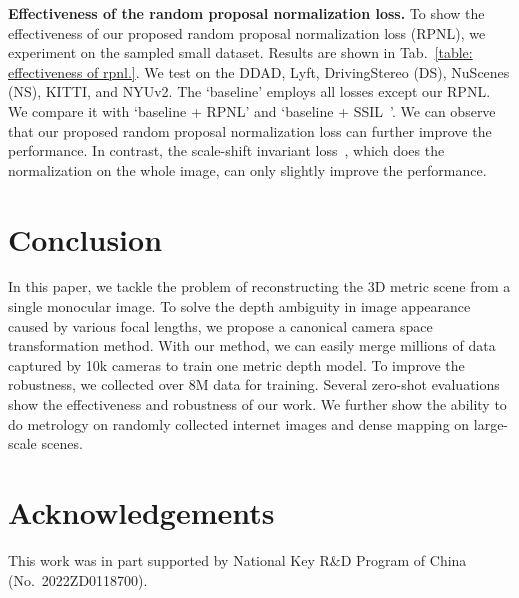 \noindent\textbf{Effectiveness of 
the random proposal normalization loss.}
To show the effectiveness of our proposed random proposal normalization loss (RPNL), we experiment on the sampled small dataset. Results are shown in Tab.~\ref{table: effectiveness of rpnl.}. We test on the DDAD, Lyft, DrivingStereo (DS), NuScenes (NS), KITTI, and NYUv2.  The `baseline' employs all losses except our RPNL. We compare it with `baseline + RPNL' and `baseline + SSIL~\cite{Ranftl2020}'. We can observe that our proposed random proposal normalization loss can further improve the performance. 
In 
contrast, the scale-shift invariant loss~\cite{Ranftl2020}, which does the normalization on the whole image, can only slightly improve the performance. 
\begin{table}[]
\caption{Effectiveness of random proposal normalization loss. Baseline is supervised by `$L_{\PWN} + L_{\VNL} + L_{silog}$'. SSIL is the scale-shift invariant loss proposed in ~\cite{Ranftl2020}.}
\vspace{-1 em}
\label{table: effectiveness of rpnl.}
\vspace{-2 em}
\end{table}



\section{Conclusion} In this paper, we 
tackle 
the problem of reconstructing the 3D metric scene from a single monocular image. To solve the depth ambiguity in image appearance caused by various focal lengths, we propose a canonical camera space transformation method. With our method, we can easily merge millions of data captured by 10k cameras to train one metric depth model. To improve the robustness, we collected over $8$M data for training. Several zero-shot evaluations show the effectiveness and robustness of our work. We further show the ability to do metrology on randomly collected internet images and dense mapping on large-scale scenes. 

\section*{Acknowledgements}

This work was in part supported by National Key R\&D Program of China (No.\  2022ZD0118700).










